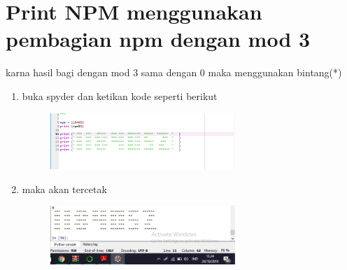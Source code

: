 \chapter*{Print NPM menggunakan pembagian npm dengan mod 3}
\par karna hasil bagi dengan mod 3 sama dengan 0 maka menggunakan bintang(*)
\begin{enumerate}
   

\item buka spyder dan ketikan kode seperti berikut
	\begin{figure} [h]
	\includegraphics[width=7cm]{npm/npm13.png}
	\centering
	\end{figure}
	
	
	
 \item maka akan tercetak 
 \begin{figure} [h]
	\includegraphics[width=7cm]{npm/npm14.png}
	\centering
	\end{figure}
 
	
	\end{enumerate}